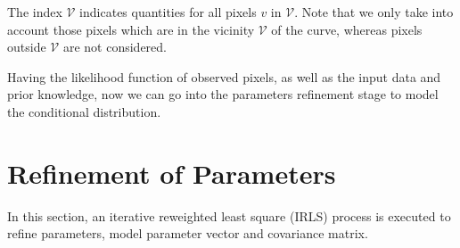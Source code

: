 The index $\mathcal{V}$ indicates quantities for all pixels $v$ in
$\mathcal{V}$. Note that we only take into account those pixels which are
in the vicinity $\mathcal{V}$ of the curve, whereas pixels outside
$\mathcal{V}$ are not considered.

Having the likelihood function of observed pixels, as well as
the input data and prior knowledge, now we can go into the parameters
refinement stage to model the conditional distribution.

\section{Refinement of  Parameters}
\label{sec:ref}
In this section, an iterative reweighted least square (IRLS) process
is executed to refine parameters, model parameter vector and covariance matrix.

